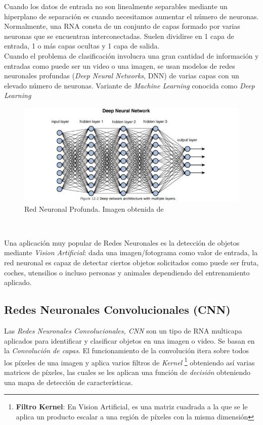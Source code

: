 Cuando los datos de entrada no son linealmente separables mediante un hiperplano de separación es cuando necesitamos aumentar el número de neuronas. Normalmente, una RNA consta de un conjunto de capas formado por varias neuronas que se encuentran interconectadas. Suelen dividirse en 1 capa de entrada, 1 o más capas ocultas y 1 capa de salida.\\

Cuando el problema de clasificación involucra una gran cantidad de información y entradas como puede ser un video o una imagen, se usan modelos de redes neuronales profundas (\textit{Deep Neural Networks}, DNN) de varias capas con un elevado número de neuronas. Variante de \textit{Machine Learning} conocida como \textit{Deep Learning}\\

\begin{figure}[H]
  \begin{center}
    \includegraphics[width=15cm]{imagenes/cap1/dnn.jpeg}
  \end{center}
  \caption[Red Neuronal Profunda (DNN)]{Red Neuronal Profunda. Imagen obtenida de \cite{dnn}}
  \label{fig:salida_perceptron}
\end{figure}\

Una aplicación muy popular de Redes Neuronales es la detección de objetos mediante \textit{Vision Artificial}: dada una imagen/fotograma como valor de entrada, la red neuronal es capaz de detectar ciertos objetos solicitados como puede ser fruta, coches, utensilios o incluso personas y animales dependiendo del entrenamiento aplicado.\\


\subsection{Redes Neuronales Convolucionales (CNN)}
\label{subsec:redes_convolucionales}

Las \textit{Redes Neuronales Convolucionales, CNN} son un tipo de RNA multicapa aplicados para identificar y clasificar objetos en una imagen o video. Se basan en la \textit{Convolución de capas}. El funcionamiento de la convolución itera sobre todos los píxeles de una imagen y aplica varios filtros de \textit{Kernel} \footnote{\textbf{Filtro Kernel}: En Vision Artificial, es una matriz cuadrada a la que se le aplica un producto escalar a una región de píxeles con la misma dimensión} obteniendo así varias matrices de píxeles, las cuales se les aplican una función de \textit{decisión} obteniendo una mapa de detección de características.\\

